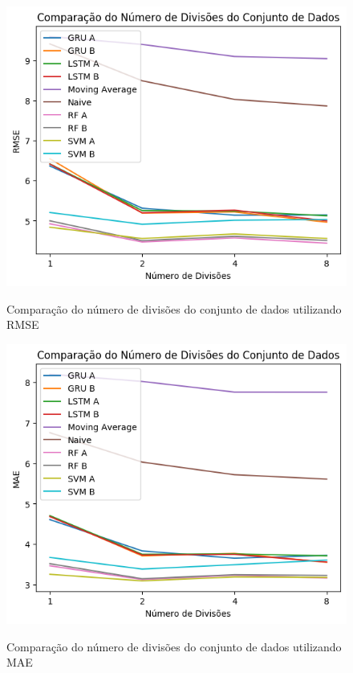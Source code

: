 
\begin{figure}[htbp]
    \centering
    \includegraphics[scale=0.8]{monography/img/comparisons/comparacao_do_numero_de_divisoes_do_conjunto_de_dados_rmse.png}
    \label{figure:numero_de_divisoes_do_conjunto_de_dados_rmse}
    \caption{Comparação do número de divisões do conjunto de dados utilizando RMSE}
\end{figure}

\begin{figure}[htbp]
    \centering
    \includegraphics[scale=0.8]{monography/img/comparisons/comparacao_do_numero_de_divisoes_do_conjunto_de_dados_mae.png}
    \label{figure:numero_de_divisoes_do_conjunto_de_dados_mae}
    \caption{Comparação do número de divisões do conjunto de dados utilizando MAE}
\end{figure}

